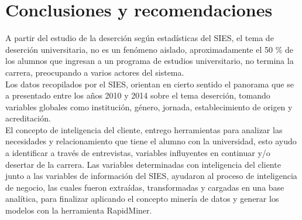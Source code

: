 \chapter[Conclusiones y recomendaciones]{Conclusiones y recomendaciones}
\label{ch:conclu}

A partir del estudio de la deserción según estadísticas del SIES, el tema de deserción universitaria, no es un fenómeno aislado, aproximadamente el 50 \%  de los alumnos que ingresan a un programa de estudios universitario, no termina la carrera, preocupando a varios actores del sistema.\\

Los datos recopilados por el SIES, orientan en cierto sentido el panorama que se a presentado entre los años 2010 y 2014 sobre el tema deserción, tomando variables globales como institución, género, jornada, establecimiento de origen y acreditación.\\

El concepto de inteligencia del cliente, entrego herramientas para analizar las necesidades y relacionamiento que tiene el alumno con la universidad, esto ayudo a identificar a través de entrevistas, variables influyentes en continuar y/o desertar de la carrera. Las variables determinadas con inteligencia del cliente junto a las variables de información del SIES, ayudaron al proceso de inteligencia de negocio, las cuales fueron extraídas, transformadas y cargadas en una base analítica, para finalizar aplicando el concepto minería de datos y generar los modelos con la herramienta RapidMiner.\\